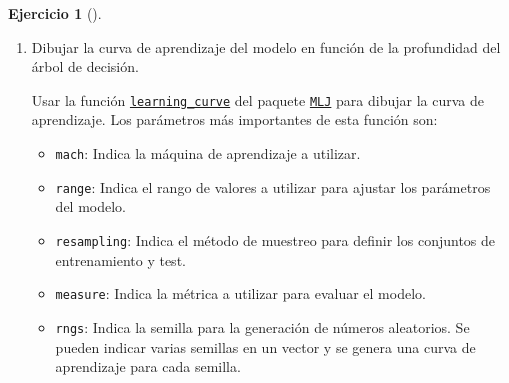 \documentclass[
  a4paper,
]{scrreport}
\providecommand{\tightlist}{%
  \setlength{\itemsep}{0pt}\setlength{\parskip}{0pt}}\usepackage{longtable,booktabs,array}
\theoremstyle{definition}
\newtheorem{exercise}{Ejercicio}[chapter]
\theoremstyle{remark}
\begin{document}
\begin{exercise}[]
\begin{enumerate}
\begin{tcolorbox}
\begin{verbatim}
DecisionTreeClassifier(
  max_depth = 5, 
  min_samples_leaf = 1, 
  min_samples_split = 2, 
  min_purity_increase = 0.0, 
  n_subfeatures = 0, 
  post_prune = false, 
  merge_purity_threshold = 1.0, 
  display_depth = 5, 
  feature_importance = :impurity, 
  rng = TaskLocalRNG())
\end{verbatim}

  \end{tcolorbox}
\item
  Dibujar la curva de aprendizaje del modelo en función de la
  profundidad del árbol de decisión.

  \begin{tcolorbox}[enhanced jigsaw, toptitle=1mm, breakable, toprule=.15mm, opacitybacktitle=0.6, coltitle=black, titlerule=0mm, arc=.35mm, title=\textcolor{quarto-callout-note-color}{\faInfo}\hspace{0.5em}{Ayuda}, rightrule=.15mm, opacityback=0, colback=white, bottomrule=.15mm, leftrule=.75mm, colbacktitle=quarto-callout-note-color!10!white, bottomtitle=1mm, colframe=quarto-callout-note-color-frame, left=2mm]

  Usar la función
  \href{https://juliaai.github.io/MLJ.jl/stable/learning_curves/\#MLJBase.learning_curve}{\texttt{learning\_curve}}
  del paquete \href{https://juliaai.github.io/MLJ.jl/}{\texttt{MLJ}}
  para dibujar la curva de aprendizaje. Los parámetros más importantes
  de esta función son:

  \begin{itemize}
  \tightlist
  \item
    \texttt{mach}: Indica la máquina de aprendizaje a utilizar.
  \item
    \texttt{range}: Indica el rango de valores a utilizar para ajustar
    los parámetros del modelo.
  \item
    \texttt{resampling}: Indica el método de muestreo para definir los
    conjuntos de entrenamiento y test.
  \item
    \texttt{measure}: Indica la métrica a utilizar para evaluar el
    modelo.
  \item
    \texttt{rngs}: Indica la semilla para la generación de números
    aleatorios. Se pueden indicar varias semillas en un vector y se
    genera una curva de aprendizaje para cada semilla.
  \end{itemize}

  \end{tcolorbox}


\end{enumerate}
\end{exercise}
\end{document}

